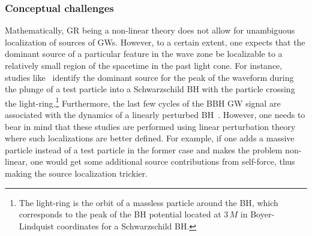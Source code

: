 

\subsubsection{Conceptual challenges}
\label{sec:Challenges}

Mathematically, GR being a non-linear theory does not allow for unambiguous localization of sources of GWs. However, to a certain extent, one expects that the dominant source of a particular feature in the wave zone be localizable to a relatively small region of the spacetime in the past light cone. For instance, studies like~\cite{PriceAndPlunge,PriceAndPlunge2} identify the dominant source for the peak of the waveform during the plunge of a test particle into a Schwarzschild BH with the particle crossing the light-ring.\footnote{The light-ring is the orbit of a massless particle around the BH, which corresponds to the peak of the BH potential located at $3\,M$ in Boyer-Lindquist coordinates for a Schwarzschild BH.} Furthermore, the last few cycles of the BBH GW signal are associated with the dynamics of a linearly perturbed BH~\cite{Teukolsky:2014vca, PhysRevD.65.044001, PhysRevD.58.084019}. However, one needs to bear in mind that these studies are performed using linear perturbation theory where such localizations are better defined. For example, if one adds a massive particle instead of a test particle in the former case and makes the problem non-linear, one would get some additional source contributions from self-force, thus making the source localization trickier.  

  

